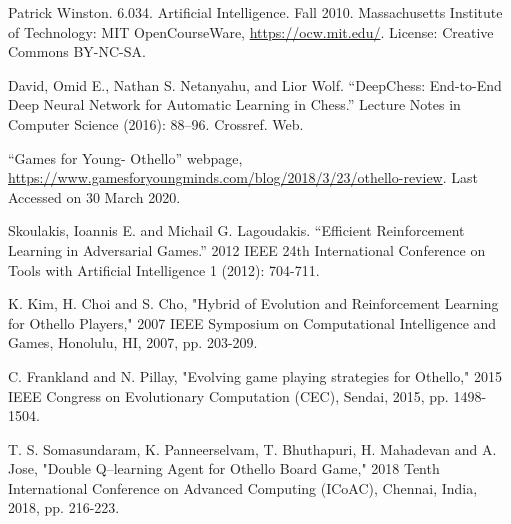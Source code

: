 \documentclass{svproc}
\begin{document}
\begin{thebibliography}{6}
%

Patrick Winston.  6.034. Artificial Intelligence. Fall 2010. Massachusetts Institute of Technology: MIT OpenCourseWare, \url{https://ocw.mit.edu/}. License: Creative Commons BY-NC-SA.

David, Omid E., Nathan S. Netanyahu, and Lior Wolf. “DeepChess: End-to-End Deep Neural Network for Automatic Learning in Chess.” Lecture Notes in Computer Science (2016): 88–96. Crossref. Web.

“Games for Young- Othello” webpage,
\url{https://www.gamesforyoungminds.com/blog/2018/3/23/othello-review}.
Last Accessed on 30 March 2020.

Skoulakis, Ioannis E. and Michail G. Lagoudakis. “Efficient Reinforcement Learning in Adversarial Games.” 2012 IEEE 24th International Conference on Tools with Artificial Intelligence 1 (2012): 704-711.

K. Kim, H. Choi and S. Cho, "Hybrid of Evolution and Reinforcement Learning for Othello Players," 2007 IEEE Symposium on Computational Intelligence and Games, Honolulu, HI, 2007, pp. 203-209.

C. Frankland and N. Pillay, "Evolving game playing strategies for Othello," 2015 IEEE Congress on Evolutionary Computation (CEC), Sendai, 2015, pp. 1498-1504.

T. S. Somasundaram, K. Panneerselvam, T. Bhuthapuri, H. Mahadevan and A. Jose, "Double Q–learning Agent for Othello Board Game," 2018 Tenth International Conference on Advanced Computing (ICoAC), Chennai, India, 2018, pp. 216-223.

\end{thebibliography}
\end{document}
